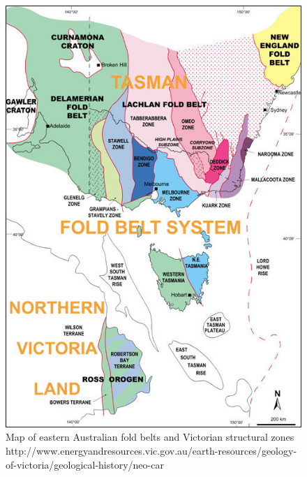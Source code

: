 \documentclass[a4paper]{article}
\begin{document}
\begin{figure}
\centering
\includegraphics[width=1\textwidth]{Geology_Neoproterozoic_Fig_2.jpg}
\caption{\label{fig:
VicStructuralZones}Map of eastern Australian fold belts and Victorian structural zones http://www.energyandresources.vic.gov.au/earth-resources/geology-of-victoria/geological-history/neo-car}
\end{figure}
\end{document}
